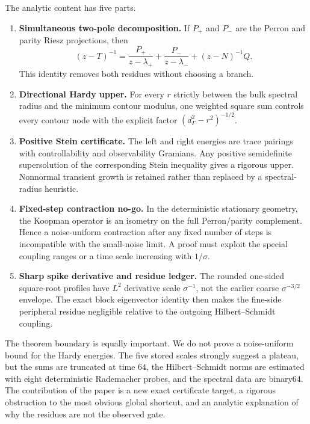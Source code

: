 \documentclass[11pt]{article}
\theoremstyle{definition}
\theoremstyle{remark}
\begin{document}
The analytic content has five parts.

\begin{enumerate}[leftmargin=2.2em]
 \item \textbf{Simultaneous two-pole decomposition.}
 If \(P_+\) and \(P_-\) are the Perron and parity Riesz projections, then
 \[
  (z-T)^{-1}
  =\frac{P_+}{z-\lambda_+}
   +\frac{P_-}{z-\lambda_-}
   +(z-N)^{-1}Q.
 \]
 This identity removes both residues without choosing a branch.

 \item \textbf{Directional Hardy upper.}
 For every \(r\) strictly between the bulk spectral radius and the minimum
 contour modulus, one weighted square sum controls every contour node with
 the explicit factor \((d_\Gamma^2-r^2)^{-1/2}\).

 \item \textbf{Positive Stein certificate.}
 The left and right energies are trace pairings with controllability and
 observability Gramians.  Any positive semidefinite supersolution of the
 corresponding Stein inequality gives a rigorous upper.  Nonnormal transient
 growth is retained rather than replaced by a spectral-radius heuristic.

 \item \textbf{Fixed-step contraction no-go.}
 In the deterministic stationary geometry, the Koopman operator is an
 isometry on the full Perron/parity complement.  Hence a noise-uniform
 contraction after any fixed number of steps is incompatible with the
 small-noise limit.  A proof must exploit the special coupling ranges or a
 time scale increasing with \(1/\sigma\).

 \item \textbf{Sharp spike derivative and residue ledger.}
 The rounded one-sided square-root profiles have \(L^2\) derivative scale
 \(\sigma^{-1}\), not the earlier coarse
 \(\sigma^{-3/2}\) envelope.  The exact block eigenvector identity then
 makes the fine-side peripheral residue negligible relative to the outgoing
 Hilbert--Schmidt coupling.
\end{enumerate}

The theorem boundary is equally important.  We do not prove a
noise-uniform bound for the Hardy energies.  The five stored scales strongly
suggest a plateau, but the sums are truncated at time \(64\), the
Hilbert--Schmidt norms are estimated with eight deterministic Rademacher
probes, and the spectral data are binary64.  The contribution of the paper
is a new exact certificate target, a rigorous obstruction to the most
obvious global shortcut, and an analytic explanation of why the residues
are not the observed gate.
\end{document}
